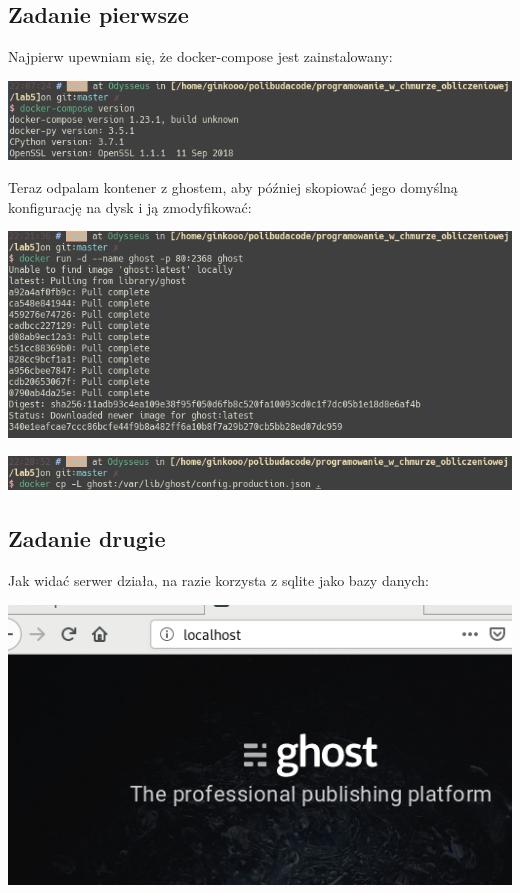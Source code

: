 \documentclass[12pt]{article}
\begin{document}
    \subsection{Zadanie pierwsze}

    Najpierw upewniam się, że docker-compose jest zainstalowany:

    \includegraphics[width=\textwidth]{1_1.png}

    Teraz odpalam kontener z ghostem, aby później skopiować jego domyślną konfigurację na dysk i ją zmodyfikować:

    \includegraphics[width=\textwidth]{1_2.png}

    \includegraphics[width=\textwidth]{1_3.png}

    \subsection{Zadanie drugie}

    Jak widać serwer działa, na razie korzysta z sqlite jako bazy danych:

    \includegraphics[width=\textwidth]{1_4.png}
\end{document}
